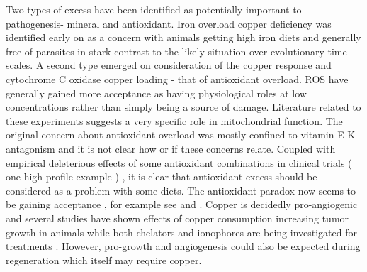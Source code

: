 {Two types of excess have been identified as potentially
important to pathogenesis- mineral and antioxidant.
Iron overload copper deficiency was identified early on as
a concern with animals getting high iron diets and generally
free of parasites in stark contrast to the likely situation over
evolutionary time scales. A second type emerged on consideration
of the copper response and cytochrome C oxidase copper loading -
that of antioxidant overload. ROS have generally gained more acceptance
as having physiological roles at low concentrations rather than simply
being a source of damage. Literature related to these experiments
suggests a very specific role in mitochondrial function.
The original concern about antioxidant overload was mostly
confined to vitamin E-K antagonism and it is not
clear how or if these concerns relate. Coupled with empirical
deleterious effects of some antioxidant combinations in clinical trials
( one high profile  example \cite{doi:10.1056/NEJM199605023341802} )
,
it is clear that antioxidant excess should be considered
as a problem with some diets.  The antioxidant paradox
now seems to be gaining acceptance , for example see \cite{PMC4412352}
 and \cite{PMC5021979}
.
Copper is decidedly pro-angiogenic 
and several studies have shown  effects of copper consumption
increasing tumor growth in animals  while both
chelators and ionophores are being investigated for treatments 
\cite{Chen_Min_Wang_Copper_homeostasis_cuproptosis_2022}.
However, pro-growth and angiogenesis could also be expected
during regeneration which itself may require copper. 



}

